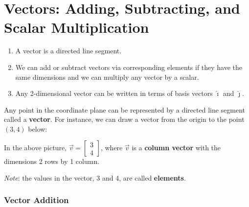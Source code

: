 \documentclass{article}
\begin{document}
\section*{Vectors: Adding, Subtracting, and Scalar Multiplication}

\begin{tcolorbox}[colframe=orange!70!white, coltitle=black, title=\textbf{Summary}]
\begin{enumerate}
    \item A vector is a directed line segment.
    \item We can add or subtract vectors via corresponding elements if they have the same dimensions and we can multiply any vector by a scalar.
    \item Any 2-dimensional vector can be written in terms of basis vectors $\hat{\imath}$ and $\hat{\jmath}$.
\end{enumerate}
\end{tcolorbox}
\bigskip 

Any point in the coordinate plane can be represented by a directed line segment called a \textbf{vector}. For instance, we can draw a vector from the origin to the point $(3,4)$ below: \newline\\
\begin{center}
\end{center}
\bigskip 

In the above picture, $\vec{v} = \begin{bmatrix}
3 \\ 4
\end{bmatrix}$, where $\vec{v}$ is a \textbf{column vector} with the dimensions 2 rows by 1 column.	\vspace{0.25in}

\emph{Note}: the values in the vector, 3 and 4, are called \textbf{elements}.
\bigskip 

\subsubsection*{Vector Addition}
\end{document}
